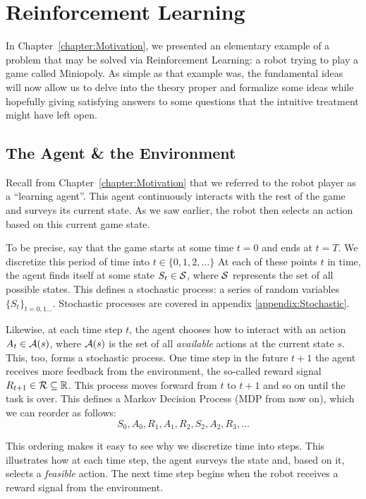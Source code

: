 \chapter{Reinforcement Learning}
\label{chapter:ReinforcementLearning}

In Chapter~\ref{chapter:Motivation}, we presented an elementary example of a
problem that may be solved via Reinforcement Learning: a robot trying to play a
game called Miniopoly. As simple as that example was, the fundamental ideas will
now allow us to delve into the theory proper and formalize some ideas while
hopefully giving satisfying answers to some questions that the intuitive
treatment might have left open.

\section{The Agent \& the Environment} Recall from
Chapter~\ref{chapter:Motivation} that we referred to the robot player as a
``learning agent''. This agent continuously interacts with the rest of the
game and surveys its current state. As we saw earlier, the robot then selects
an action based on this current game state.

To be precise, say that the game starts at some time $t=0$ and ends at $t=T$. We
discretize this period of time into $t \in \{0, 1, 2, \ldots \}$ At each of
these points $t$ in time, the agent finds itself at some state $S_t \in
\mathcal{S}$, where $\mathcal{S}$ represents the set of all possible states. This
defines a stochastic process: a series of random variables $\{ S_t \}_{t = 0, 1
\ldots}$. Stochastic processes are covered in appendix
\ref{appendix:Stochastic}.

Likewise, at each time step $t$, the agent chooses how to interact with an action
$A_t \in \mathcal{A}(s)$, where $\mathcal{A}(s)$ is the set of all \textit{available}
actions at the current state $s$. This, too, forms a stochastic process. One time
step in the future $t+1$ the agent receives more feedback from the environment,
the so-called reward signal $R_{t+1} \in \mathcal{R} \subseteq \mathbb{R}$. This process
moves forward from $t$ to $t+1$ and so on until the task is over. This defines a
Markov Decision Process (MDP from now on), which we can reorder as follows:
\begin{equation} S_0, A_0, R_1, A_1, R_2, S_2, A_2, R_3, \ldots \end{equation}

This ordering makes it easy to see why we discretize time
into steps. This illustrates how at each time step, the agent surveys the state
and, based on it, selects a \textit{feasible} action. The next time step begins
when the robot receives a reward signal from the environment. 

